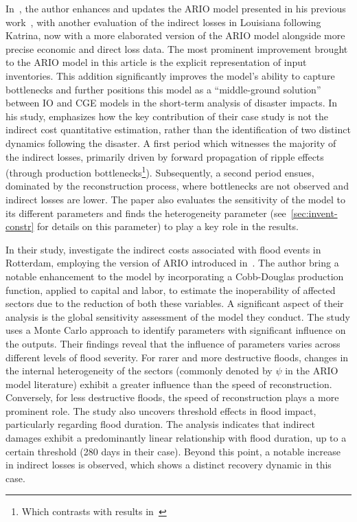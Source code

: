 In~\textcite{hallegatte-2013-model-role}, the author enhances and
updates the ARIO model presented in his previous
work~\citeyear{hallegatte-2008-adapt-region}, with another
evaluation of the indirect losses in Louisiana following Katrina, now with a
more elaborated version of the ARIO model alongside more precise economic and
direct loss data. The most prominent improvement brought to the ARIO model in
this article is the explicit representation of input inventories. This addition
significantly improves the model's ability to capture bottlenecks and further
positions this model as a ``middle-ground solution''
between IO and CGE models in the short-term analysis of disaster impacts. In
his study, \textcite{hallegatte-2013-model-role} emphasizes
how the key contribution of their case study is not the indirect cost
quantitative estimation, rather than the identification of two distinct dynamics
following the disaster. A first period which witnesses the majority of the
indirect losses, primarily driven by forward propagation of ripple effects
(through production bottlenecks\footnote{Which contrasts with results
  in~\textcite{hallegatte-2008-adapt-region}}). Subsequently, a
second period ensues, dominated by the reconstruction process, where
bottlenecks are not observed and indirect losses are lower. The paper also
evaluates the sensitivity of the model to its different parameters and finds the
heterogeneity parameter (see~\cref{sec:invent-constr} for details on this
parameter) to play a key role in the results.

In their study,
\textcite{koks-2014-integ-direc} investigate the indirect
costs associated with flood events in Rotterdam, employing the version of
ARIO introduced in~\textcite{hallegatte-2013-model-role}.
The author bring a notable enhancement to the model by incorporating a Cobb-Douglas
production function, applied to capital and labor, to estimate the inoperability
of affected sectors due to the reduction of both these variables. A significant aspect of their analysis is the global sensitivity assessment
of the model they conduct. The study uses a Monte Carlo approach to identify
parameters with significant influence on the outputs. Their findings reveal that
the influence of parameters varies across different levels of flood severity.
For rarer and more destructive floods, changes in the internal heterogeneity of the
sectors (commonly denoted by $\psi$ in the ARIO model literature) exhibit a
greater influence than the speed of reconstruction.
Conversely, for less destructive floods, the speed of reconstruction plays a
more prominent role. The study also uncovers threshold effects in flood impact, particularly
regarding flood duration. The analysis indicates that indirect damages exhibit a
predominantly linear relationship with flood duration, up to a certain threshold
(280 days in their case). Beyond this point, a notable increase in indirect losses
is observed, which shows a distinct recovery dynamic in this case.

